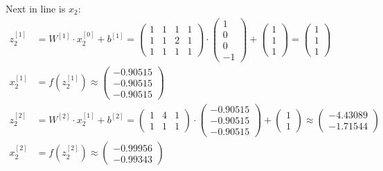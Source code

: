 \documentclass[12pt]{article}
\begin{document}
\begin{enumerate}[leftmargin=\labelsep]
          \vskip -0.2cm
          Next in line is $x_2$:
            \begingroup
            \allowdisplaybreaks
            \begin{align*}
                z^{[1]}_2 &= {W}^{[1]} \cdot {x}^{[0]}_2 + {b}^{[1]} = \begin{pmatrix} 1 & 1 & 1 & 1 \\ 1 & 1 & 2 & 1 \\ 1 & 1 & 1 & 1\end{pmatrix} \cdot  \begin{pmatrix} 1 \\ 0 \\ 0 \\ -1 \end{pmatrix} +
                \begin{pmatrix} 1 \\ 1 \\ 1\end{pmatrix} = \begin{pmatrix} 1 \\ 1 \\ 1\end{pmatrix} \\
                {x}^{[1]}_2 &= f\left({z}^{[1]}_2\right) \approx \begin{pmatrix} -0.90515 \\ -0.90515 \\ -0.90515\end{pmatrix} \\
                z^{[2]}_2 &= {W}^{[2]} \cdot {x}^{[1]}_2 + {b}^{[2]} = \begin{pmatrix} 1 & 4 & 1 \\ 1 & 1 & 1\end{pmatrix} \cdot  \begin{pmatrix} -0.90515 \\ -0.90515 \\ -0.90515 \end{pmatrix} +
                \begin{pmatrix} 1 \\ 1\end{pmatrix} \approx \begin{pmatrix} -4.43089 \\ -1.71544\end{pmatrix} \\
                {x}^{[2]}_2 &= f\left({z}^{[2]}_2\right) \approx \begin{pmatrix} -0.99956 \\ -0.99343\end{pmatrix} \\

\end{align*}
\end{enumerate}
\end{document}
